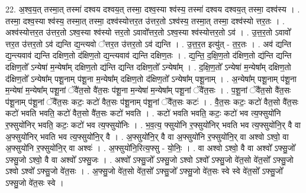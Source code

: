 \documentclass[17pt]{extarticle}
\begin{document}
22. अ॒श्व॒य॒त् तस्मा॒त् तस्मा॑ दश्वय दश्वय॒त् तस्मा॒ दश्व॒स्या श्व॑स्य॒ तस्मा॑ दश्वय दश्वय॒त् तस्मा॒ दश्व॑स्य । . तस्मा॒ दश्व॒स्या श्व॑स्य॒ तस्मा॒त् तस्मा॒ दश्व॑स्योत्तर॒त उ॑त्तर॒तो ऽश्व॑स्य॒ तस्मा॒त् तस्मा॒ दश्व॑स्यो त्तर॒तः । . अश्व॑स्योत्तर॒त उ॑त्तर॒तो ऽश्व॒स्या श्व॑स्यो त्तर॒तो ऽवावो᳚त्तर॒तो ऽश्व॒स्या श्व॑स्योत्तर॒तो ऽव॑ । . उ॒त्त॒र॒तो ऽवावो᳚ त्तर॒त उ॑त्तर॒तो ऽव॑ द्यन्ति द्य॒न्त्यवो ᳚त्तर॒त उ॑त्तर॒तो ऽव॑ द्यन्ति । . उ॒त्त॒र॒त इत्यु॑त् - त॒र॒तः । . अव॑ द्यन्ति द्य॒न्त्यवाव॑ द्यन्ति दक्षिण॒तो द॑क्षिण॒तो द्य॒न्त्यवाव॑ द्यन्ति दक्षिण॒तः । . द्य॒न्ति॒ द॒क्षि॒ण॒तो द॑क्षिण॒तो द्य॑न्ति द्यन्ति दक्षिण॒तो᳚ ऽन्येषा॑ म॒न्येषा᳚म् दक्षिण॒तो द्य॑न्ति द्यन्ति दक्षिण॒तो᳚ ऽन्येषा᳚म् । . द॒क्षि॒ण॒तो᳚ ऽन्येषा॑ म॒न्येषा᳚म् दक्षिण॒तो द॑क्षिण॒तो᳚ ऽन्येषा᳚म् पशू॒नाम् प॑शू॒ना म॒न्येषा᳚म् दक्षिण॒तो द॑क्षिण॒तो᳚ ऽन्येषा᳚म् पशू॒नाम् । . अ॒न्येषा᳚म् पशू॒नाम् प॑शू॒ना म॒न्येषा॑ म॒न्येषा᳚म् पशू॒नां ॅवै॑त॒सो वै॑त॒सः प॑शू॒ना म॒न्येषा॑ म॒न्येषा᳚म् पशू॒नां ॅवै॑त॒सः । . प॒शू॒नां ॅवै॑त॒सो वै॑त॒सः प॑शू॒नाम् प॑शू॒नां ॅवै॑त॒सः कटः॒ कटो॑ वैत॒सः प॑शू॒नाम् प॑शू॒नां ॅवै॑त॒सः कटः॑ । . वै॒त॒सः कटः॒ कटो॑ वैत॒सो वै॑त॒सः कटो॑ भवति भवति॒ कटो॑ वैत॒सो वै॑त॒सः कटो॑ भवति । . कटो॑ भवति भवति॒ कटः॒ कटो॑ भव त्य॒फ्सुयो॑नि र॒फ्सुयो॑निर् भवति॒ कटः॒ कटो॑ भव त्य॒फ्सुयो॑निः । . भ॒व॒त्य॒ फ्सुयो॑नि र॒फ्सुयो॑निर् भवति भव त्य॒फ्सुयो॑नि॒र् वै वा अ॒फ्सुयो॑निर् भवति भव त्य॒फ्सुयो॑नि॒र् वै । . अ॒फ्सुयो॑नि॒र् वै वा अ॒फ्सुयो॑नि र॒फ्सुयो॑नि॒र् वा अश्वो ऽश्वो॒ वा अ॒फ्सुयो॑नि र॒फ्सुयो॑नि॒र् वा अश्वः॑ । . अ॒फ्सुयो॑नि॒रित्य॒फ्सु - यो॒निः॒ । . वा अश्वो ऽश्वो॒ वै वा अश्वो᳚ ऽफ्सु॒जो᳚ ऽफ्सु॒जो ऽश्वो॒ वै वा अश्वो᳚ ऽफ्सु॒जः । . अश्वो᳚ ऽफ्सु॒जो᳚ ऽफ्सु॒जो ऽश्वो ऽश्वो᳚ ऽफ्सु॒जो वे॑त॒सो वे॑त॒सो᳚ ऽफ्सु॒जो ऽश्वो ऽश्वो᳚ ऽफ्सु॒जो वे॑त॒सः । . अ॒फ्सु॒जो वे॑त॒सो वे॑त॒सो᳚ ऽफ्सु॒जो᳚ ऽफ्सु॒जो वे॑त॒सः स्वे स्वे वे॑त॒सो᳚ ऽफ्सु॒जो᳚ ऽफ्सु॒जो वे॑त॒सः स्वे । \newline
\end{document}
